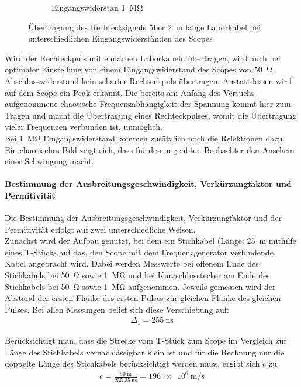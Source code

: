 \documentclass[a4paper,twoside,final]{article}
\begin{document}
\begin{figure}[htp]
\begin{subfigure}{0.45\textwidth}
        \caption{Eingangswiderstan \SI{1}{\mega\ohm}}
    \end{subfigure}
    \caption{Übertragung des Rechtecksignals über \SI{2}{\meter} lange Laborkabel bei unterschiedlichen Eingangswiderständen des Scopes}
\end{figure}

Wird der Rechteckpuls mit einfachen Laborkabeln übertragen, wird auch bei optimaler Einstellung von einem Eingangswiderstand des Scopes von \SI{50}{\ohm} Abschlusswiderstand kein scharfer Rechteckpuls übertragen. Anstattdessen wird auf dem Scope ein Peak erkannt. Die bereits am Anfang des Versuchs aufgenommene chaotische Frequenzabhängigkeit der Spannung kommt hier zum Tragen und macht die Übertragung eines Rechteckpulses, womit die Übertragung vieler Frequenzen verbunden ist, unmöglich. \\
Bei \SI{1}{\mega\ohm} Eingangswiderstand kommen zusätzlich noch die Relektionen dazu. Ein chaotisches Bild zeigt sich, dass für den ungeübten Beobachter den Anschein einer Schwingung macht. \\


\paragraph{Bestimmung der Ausbreitungsgeschwindigkeit, Verkürzungfaktor und Permitivität}
Die Bestimmung der Ausbreitungsgeschwindigkeit, Verkürzungfaktor und der Permitivität erfolgt auf zwei unterschiedliche Weisen. \\
Zunächst wird der Aufbau genutzt, bei dem ein Stichkabel (Länge: \SI{25}{\meter} mithilfe eines T-Stücks auf das, den Scope mit dem Frequenzgenerator verbindende, Kabel angebracht wird. Dabei werden Messwerte bei offenem Ende des Stichkabels bei \SI{50}{\ohm} sowie \SI{1}{\mega\ohm} und bei Kurzschlusstecker am Ende des Stichkabels bei \SI{50}{\ohm} sowie \SI{1}{\mega\ohm} aufgenommen. Jeweils gemessen wird der Abstand der ersten Flanke des ersten Pulses zur gleichen Flanke des gleichen Pulses. Bei allen Messungen belief sich diese Verschiebung auf:
\begin{align}
\Delta_1 = \SI{255}{\nano\second}
\end{align}

Berücksichtigt man, dass die Strecke vom T-Stück zum Scope im Vergleich zur Länge des Stichkabels vernachlässigbar klein ist und für die Rechnung nur die doppelte Länge des Stichkabels berücksichtigt werden muss, ergibt sich c zu
\begin{align}
c = \frac{\SI{50}{\meter}}{\SI{255,35}{\nano\second}} = \SI{196e6}{\meter\per\second}
\end{align}
\end{document}
